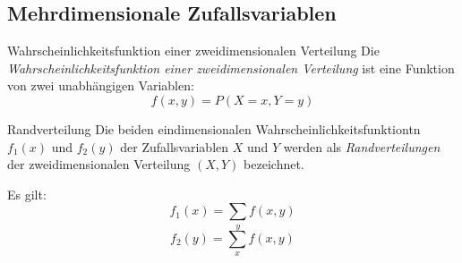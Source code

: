 \subsection{Mehrdimensionale Zufallsvariablen}

\begin{defi}{Wahrscheinlichkeitsfunktion einer zweidimensionalen Verteilung}
    Die \emph{Wahrscheinlichkeitsfunktion einer zweidimensionalen Verteilung} ist eine Funktion von zwei unabhängigen Variablen: 
    \[ 
        f(x,y) = P(X = x, Y = y)
    \]
\end{defi}

\begin{defi}{Randverteilung}
    Die beiden eindimensionalen Wahrscheinlichkeitsfunktiontn $f_1(x)$ und $f_2(y)$ der Zufallsvariablen $X$ und $Y$ werden als \emph{Randverteilungen} der zweidimensionalen Verteilung $(X,Y)$ bezeichnet.

    Es gilt: 
    \[ 
        f_1(x) = \sum_{y} f(x,y) 
    \] 
    \[ 
        f_2(y) = \sum_{x} f(x,y) 
    \] 
\end{defi}

